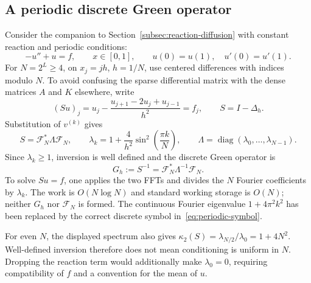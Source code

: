 \documentclass[11pt,a4paper]{article}
\numberwithin{equation}{section}
\begin{document}
\subsection{A periodic discrete Green operator}
Consider the companion to Section~\ref{subsec:reaction-diffusion} with constant reaction and periodic conditions:
\begin{equation}
 -u''+u=f,\qquad x\in[0,1],\qquad u(0)=u(1),\quad u'(0)=u'(1).
 \label{eq:periodic-pde}
\end{equation}
For $N=2^L\ge4$, on $x_j=jh$, $h=1/N$, use centered differences with indices modulo $N$. To avoid confusing the sparse differential matrix with the dense matrices $A$ and $K$ elsewhere, write
\begin{equation}
 (Su)_j=u_j-\frac{u_{j+1}-2u_j+u_{j-1}}{h^2}=f_j,
 \qquad S=I-\Delta_h.
 \label{eq:periodic-stencil}
\end{equation}
Substitution of $v^{(k)}$ gives
\begin{equation}
 S=\mathcal F_N^*\Lambda\mathcal F_N,
 \qquad
 \lambda_k=1+\frac4{h^2}\sin^2\!\left(\frac{\pi k}{N}\right),\qquad
 \Lambda=\operatorname{diag}(\lambda_0,\ldots,\lambda_{N-1}).
 \label{eq:periodic-symbol}
\end{equation}
Since $\lambda_k\ge1$, inversion is well defined and the discrete Green operator is
\begin{equation}
 G_h:=S^{-1}=\mathcal F_N^*\Lambda^{-1}\mathcal F_N.
 \label{eq:periodic-green}
\end{equation}
To solve $Su=f$, one applies the two FFTs and divides the $N$ Fourier coefficients by $\lambda_k$. The work is $O(N\log N)$ and standard working storage is $O(N)$; neither $G_h$ nor $\mathcal F_N$ is formed. The continuous Fourier eigenvalue $1+4\pi^2k^2$ has been replaced by the correct discrete symbol in~\eqref{eq:periodic-symbol}.

For even $N$, the displayed spectrum also gives $\kappa_2(S)=\lambda_{N/2}/\lambda_0=1+4N^2$. Well-defined inversion therefore does not mean conditioning is uniform in $N$. Dropping the reaction term would additionally make $\lambda_0=0$, requiring compatibility of $f$ and a convention for the mean of $u$.
\end{document}
